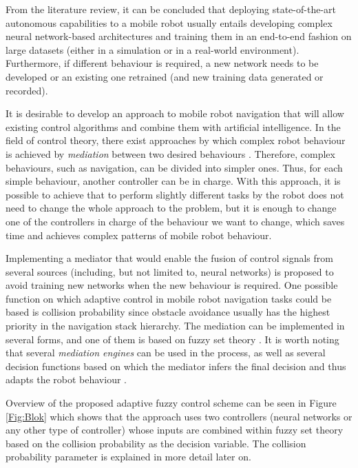 From the literature review, it can be concluded that deploying state-of-the-art autonomous capabilities to a mobile robot usually entails developing complex neural network-based architectures and training them in an end-to-end fashion on large datasets (either in a simulation or in a real-world environment). Furthermore, if different behaviour is required, a new network needs to be developed or an existing one retrained (and new training data generated or recorded). 

It is desirable to develop an approach to mobile robot navigation that will allow existing control algorithms and combine them with artificial intelligence. In the field of control theory, there exist approaches by which complex robot behaviour is achieved by \emph{mediation} between two desired behaviours \cite{Vincenti2009}. Therefore, complex behaviours, such as navigation, can be divided into simpler ones. Thus, for each simple behaviour, another controller can be in charge. With this approach, it is possible to achieve that to perform slightly different tasks by the robot does not need to change the whole approach to the problem, but it is enough to change one of the controllers in charge of the behaviour we want to change, which saves time and achieves complex patterns of mobile robot behaviour. 

Implementing a mediator that would enable the fusion of control signals from several sources (including, but not limited to, neural networks) is proposed to avoid training new networks when the new behaviour is required. One possible function on which adaptive control in mobile robot navigation tasks could be based is collision probability \cite{Lunenburg2017} since obstacle avoidance usually has the highest priority in the navigation stack hierarchy. The mediation can be implemented in several forms, and one of them is based on fuzzy set theory \cite{Chen2017}. It is worth noting that several \emph{mediation engines} can be used in the process, as well as several decision functions based on which the mediator infers the final decision and thus adapts the robot behaviour \cite{Vincenti2009}.

Overview of the proposed adaptive fuzzy control scheme can be seen in Figure \ref{Fig:Blok} which shows that the approach uses two controllers (neural networks or any other type of controller) whose inputs are combined within fuzzy set theory based on the collision probability as the decision variable. The collision probability parameter is explained in more detail later on.

